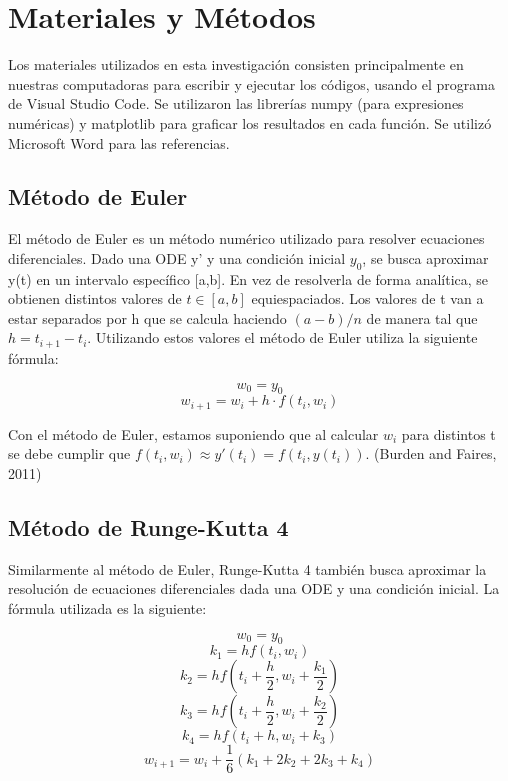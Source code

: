 \documentclass{article}
\begin{document}
\vspace{0.5\baselineskip}

\section*{Materiales y Métodos}

\noindent Los materiales utilizados en esta investigación consisten principalmente en nuestras computadoras para escribir y ejecutar los códigos, usando el programa de Visual Studio Code. Se utilizaron las librerías numpy (para expresiones numéricas) y matplotlib para graficar los resultados en cada función. Se utilizó Microsoft Word para las referencias.

\subsection*{Método de Euler}

\noindent El método de Euler es un método numérico utilizado para resolver ecuaciones diferenciales. Dado una ODE y' y una condición inicial $y_{0}$, se busca aproximar y(t) en un intervalo específico [a,b]. En vez de resolverla de forma analítica, se obtienen distintos valores de $t \in [a,b]$ equiespaciados. Los valores de t van a estar separados por h que se calcula haciendo $(a-b)/n$ de manera tal que $h = t_{i+1} - t_{i}$. Utilizando estos valores el método de Euler utiliza la siguiente fórmula:

\setlength{\baselineskip}{0.75\baselineskip}
\[ w_{0} = y_{0} \]
\[ w_{i+1} = w_{i} + h \cdot f(t_{i}, w_{i}) \]
\setlength{\abovedisplayskip}{-6pt}
\vspace{0.5\baselineskip}

\noindent Con el método de Euler, estamos suponiendo que al calcular $w_{i}$ para distintos t se debe cumplir que $f(t_{i},w_{i}) \approx y'(t_{i}) = f(t_{i},y(t_{i}))$. (Burden and Faires, 2011)

\subsection*{Método de Runge-Kutta 4}

\noindent Similarmente al método de Euler, Runge-Kutta 4 también busca aproximar la resolución de ecuaciones diferenciales dada una ODE y una condición inicial. La fórmula utilizada es la siguiente:

\setlength{\baselineskip}{0.75\baselineskip}
\[ w_{0} = y_{0} \]
\[k_{1} = hf(t_{i}, w_{i})\]
\[k_{2} = hf(t_{i} + \frac{h}{2}, w_{i} + \frac{k_{1}}{2})
\]
\[
k_{3} = hf(t_{i} + \frac{h}{2}, w_{i} + \frac{k_{2}}{2})
\]
\[
k_{4} = hf(t_{i} + h, w_{i} + k_{3})\]
\[w_{i+1} = w_{i} + \frac{1}{6}(k_{1} + 2k_{2} + 2k_{3} + k_{4})
\]
\end{document}
